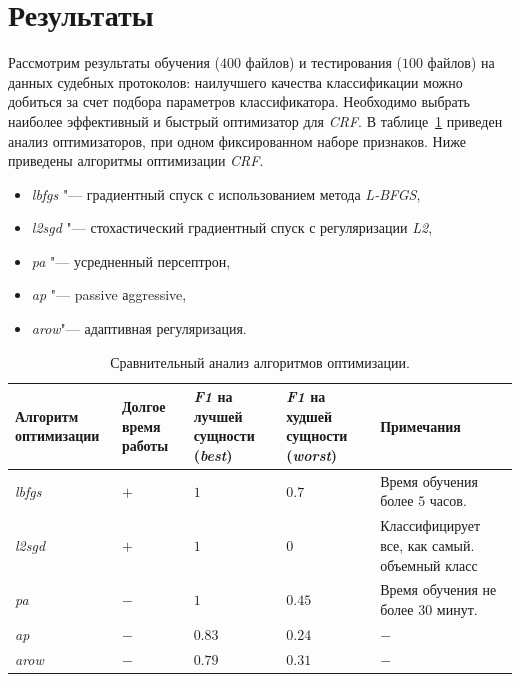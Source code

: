 \documentclass{csmathnotes}
\begin{document}
\section*{Результаты}
Рассмотрим результаты обучения ($400$ файлов) и тестирования ($100$ файлов) на данных судебных протоколов: наилучшего качества классификации можно добиться за счет подбора параметров классификатора. Необходимо выбрать наиболее эффективный и быстрый оптимизатор для \emph{CRF}. В таблице~\ref{tabl:table1} приведен анализ оптимизаторов, при одном фиксированном наборе признаков. Ниже приведены алгоритмы оптимизации \emph{CRF}.

\begin{itemize}
    \item \emph{lbfgs} "--- градиентный спуск с использованием метода 
    \emph{L-BFGS},
    \item \emph{l2sgd} "--- стохастический  градиентный спуск с регуляризации \emph{L2},
    \item \emph{pa} "--- усредненный персептрон,
    \item \emph{ap} "--- passive аggressive,
    \item \emph{arow}"--- адаптивная регуляризация.
\end{itemize}

\begin{table}[!h]
    \begin{center}
        \begin{tabular}{|p{2cm}|p{1.6cm}|p{1.5cm}|p{1.5cm}|p{2.5cm}|}
            \hline
            Алгоритм оптимизации &  Долгое время работы & \emph{F1} на лучшей сущности (\emph{best}) & \emph{F1} на худшей сущности (\emph{worst}) & Примечания \\
            \hline
            \emph{lbfgs} & $+$ & $1$ & $0.7$ & Время обучения более $5$ часов.  \\
            \hline
            \emph{l2sgd} & $+$ & $1$  & $0$ & Классифицирует все, как самый. объемный класс \\
            \hline
            \emph{pa} & $-$ & $1$  & $0.45$ & Время обучения не более $30$ минут. \\
            \hline
            \emph{ap} & $-$ & $0.83$ & $0.24$  & $-$ \\
            \hline
            \emph{arow} & $-$ & $0.79$ & $0.31$  & $-$ \\
            \hline
        \end{tabular}
    \end{center}
    \caption{\label{tabl:table1}Сравнительный анализ алгоритмов оптимизации.}
\end{table}
\end{document}
